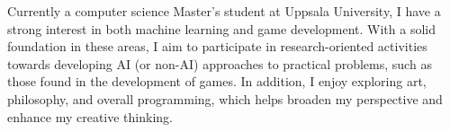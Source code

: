 

\begin{cvparagraph}

\vspace{2pt}
Currently a computer science Master's student at Uppsala University, I have a strong interest in both machine learning and game development. With a solid foundation in these areas, I aim to participate in research-oriented activities towards developing AI (or non-AI) approaches to practical problems, such as those found in the development of games. In addition, I enjoy exploring art, philosophy, and overall programming, which helps broaden my perspective and enhance my creative thinking.
\end{cvparagraph}
